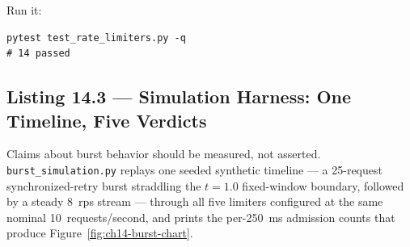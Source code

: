 Run it:

\begin{verbatim}
pytest test_rate_limiters.py -q
# 14 passed
\end{verbatim}

\subsection{Listing 14.3 --- Simulation Harness: One Timeline, Five Verdicts}
\label{subsec:ch14-listing-sim}

Claims about burst behavior should be measured, not asserted.
\texttt{burst\_simulation.py} replays one seeded synthetic timeline --- a
25-request synchronized-retry burst straddling the $t{=}1.0$ fixed-window
boundary, followed by a steady 8~rps stream --- through all five limiters
configured at the same nominal 10~requests/second, and prints the
per-250~ms admission counts that produce Figure~\ref{fig:ch14-burst-chart}.

